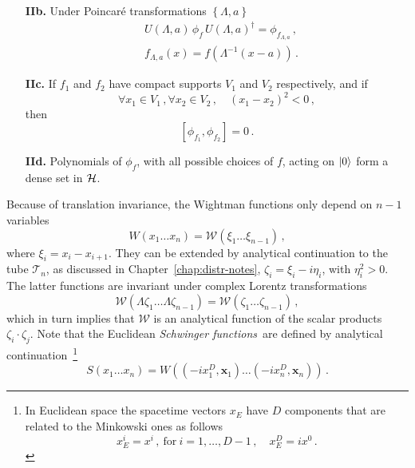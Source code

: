\begin{enumerate}
    \item [{\bf IIb.}] Under Poincar\'e transformations $\left\{\Lambda, a\right\}$
    \begin{align}
        & U(\Lambda,a)\, \phi_f\, U(\Lambda,a)^\dagger 
            = \phi_{f_{\Lambda,a}} \, , \\
        & f_{\Lambda,a}(x) = f\left(\Lambda^{-1}(x-a)\right)\, .
    \end{align}

    \item [{\bf IIc.}] If $f_1$ and $f_2$ have compact supports $V_1$ and $V_2$ respectively, and if 
    \[
        \forall x_1 \in V_1\, , \forall x_2 \in V_2 \, ,    
        \quad (x_1 - x_2)^2 < 0\, ,
    \]
    then 
    \begin{equation}
        \label{eq:SmearedLightConeComm}
        \left[ \phi_{f_1} , \phi_{f_2} \right] = 0\, .
    \end{equation}

    \item [{\bf IId.}] Polynomials of $\phi_f$, with all possible choices of $f$, 
    acting on $| 0 \rangle$ form a dense set in $\mathcal{H}$.
\end{enumerate}

Because of translation invariance, the Wightman functions only depend on $n-1$
variables
\begin{equation}
    \label{eq:WightFunTransInv}
    W(x_1 \ldots x_n) = \mathcal{W}\left(\xi_1 \ldots \xi_{n-1}\right)\, ,
\end{equation}
where $\xi_i = x_i - x_{i+1}$. They can be extended by
analytical continuation to the tube $\mathcal{T}_n$, as discussed in Chapter~\ref{chap:distr-notes}, 
$\zeta_i = \xi_i - i \eta_i$, with $\eta_i^2>0$.
The latter functions are invariant under complex Lorentz transformations
\begin{equation}
    \label{eq:ComplexLorentzInv}
    \mathcal{W}(\Lambda\zeta_1 \ldots \Lambda\zeta_{n-1}) =
    \mathcal{W}(\zeta_1 \ldots \zeta_{n-1})\, ,
\end{equation}
which in turn implies that $\mathcal{W}$ is an analytical function of the scalar
products $\zeta_i \cdot \zeta_j$. Note that the Euclidean {\em Schwinger
functions}\ are defined by analytical continuation~\footnote{In Euclidean space 
the spacetime vectors $x_E$ have $D$ components that are related to the Minkowski 
ones as follows
\[
 x_E^i = x^i\, ,~\mathrm{for}~i=1, \ldots,D-1\, , \quad x_E^D = i x^0\, .   
\] }
\begin{equation}
    \label{eq:SchwingFunDef}
    S(x_1 \ldots x_n) = 
        W\left((-i x_1^D, \mathbf{x}_1) 
        \ldots (-i x_n^D, \mathbf{x}_n)\right)\, .
\end{equation}

